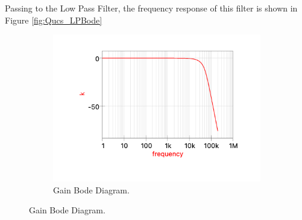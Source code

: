 Passing to the Low Pass Filter, the frequency response of this filter is shown in Figure \ref{fig:Qucs_LPBode}

\begin{figure}[H]
    \centering

    \begin{subfigure}[b]{0.5\textwidth}
        \centering
        \includegraphics[width=\textwidth]{Images/Qucs_LPgain.png}
        \caption{Gain Bode Diagram.}
        \label{fig:Qucs_LPgain}
    \end{subfigure}%


\end{figure}
